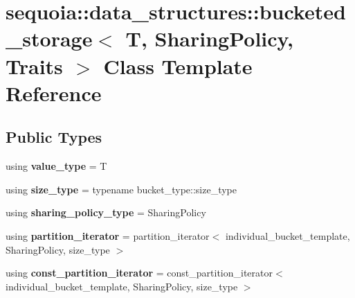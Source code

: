 \hypertarget{classsequoia_1_1data__structures_1_1bucketed__storage}{}\section{sequoia\+::data\+\_\+structures\+::bucketed\+\_\+storage$<$ T, Sharing\+Policy, Traits $>$ Class Template Reference}
\label{classsequoia_1_1data__structures_1_1bucketed__storage}
\subsection*{Public Types}
\begin{DoxyCompactItemize}
\item 
\mbox{\label{classsequoia_1_1data__structures_1_1bucketed__storage_a1633f9b1d5f06c47836422d53337660d}} 
using {\bfseries value\+\_\+type} = T
\item 
\mbox{\label{classsequoia_1_1data__structures_1_1bucketed__storage_adf976cf9199b6656950a0f9a1acc5d9b}} 
using {\bfseries size\+\_\+type} = typename bucket\+\_\+type\+::size\+\_\+type
\item 
\mbox{\label{classsequoia_1_1data__structures_1_1bucketed__storage_a31c8ba7d81ca8a4cefa9ca7e186d3fe5}} 
using {\bfseries sharing\+\_\+policy\+\_\+type} = Sharing\+Policy
\item 
\mbox{\label{classsequoia_1_1data__structures_1_1bucketed__storage_ac290e3b331cb991f378c30e5607aa3a5}} 
using {\bfseries partition\+\_\+iterator} = partition\+\_\+iterator$<$ individual\+\_\+bucket\+\_\+template, Sharing\+Policy, size\+\_\+type $>$
\item 
\mbox{\label{classsequoia_1_1data__structures_1_1bucketed__storage_a6ac637ff689c81f8ad99ff6b20f67daf}} 
using {\bfseries const\+\_\+partition\+\_\+iterator} = const\+\_\+partition\+\_\+iterator$<$ individual\+\_\+bucket\+\_\+template, Sharing\+Policy, size\+\_\+type $>$
\item 

\end{DoxyCompactItemize}

